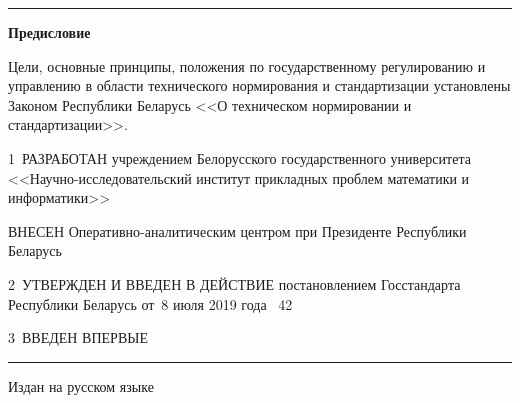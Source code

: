 \hrule 

\rule{0pt}{5mm}

\centerline{\bf Предисловие} 
Цели, основные принципы, положения по государственному регулированию и управлению в 
области технического нормирования и стандартизации установлены Законом Республики Беларусь
<<О техническом нормировании и стандартизации>>. 

\vskip0.2cm

1~РАЗРАБОТАН учреждением Белорусского государственного университета 
<<Научно-исследовательский институт прикладных проблем математики и 
информатики>>

ВНЕСЕН Оперативно-аналитическим центром при Президенте 
Республики Беларусь

2~УТВЕРЖДЕН И ВВЕДЕН В ДЕЙСТВИЕ постановлением Госстандарта Республики 
Беларусь от~8 июля 2019 года \No~42 

3~ВВЕДЕН ВПЕРВЫЕ

\vfill

\hrule
\vskip1mm
Издан на русском языке

\pagebreak
